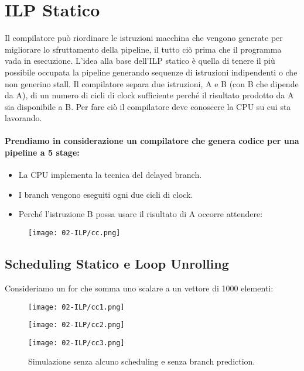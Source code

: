 \section{ILP Statico} 

Il compilatore può riordinare le istruzioni macchina che vengono generate per migliorare lo sfruttamento della pipeline, il tutto ciò prima che il programma vada in esecuzione. L'idea alla base dell'ILP statico è quella di tenere il più possibile occupata la pipeline generando sequenze di istruzioni indipendenti o che non generino stall. Il compilatore separa due istruzioni, A e B (con B che dipende da A), di un numero di cicli di clock sufficiente perché il risultato prodotto da A sia disponibile a B. Per fare ciò il compilatore deve conoscere la CPU su cui sta lavorando. 


\paragraph{Prendiamo in considerazione un compilatore che genera codice per una pipeline a 5 stage:}

\begin{itemize}
  \item La CPU implementa la tecnica del delayed branch. 
  \item I branch vengono eseguiti ogni due cicli di clock. 
  \item Perché l'istruzione B possa usare il risultato di A occorre attendere:
\end{itemize}

\begin{figure}[!h]
    \centering
    \texttt{[image: 02-ILP/cc.png]}
\end{figure}

\subsection{Scheduling Statico e Loop Unrolling}

Consideriamo un for che somma uno scalare a un vettore di 1000 elementi:

\begin{figure}[!h]
    \centering
    \texttt{[image: 02-ILP/cc1.png]}
\end{figure}


\begin{figure}[!h]
    \centering
    \texttt{[image: 02-ILP/cc2.png]}
\end{figure}
\pagebreak
\begin{figure}[!h]
    \centering
    \texttt{[image: 02-ILP/cc3.png]}
    \caption{Simulazione senza alcuno scheduling e senza branch prediction.}
\end{figure}

